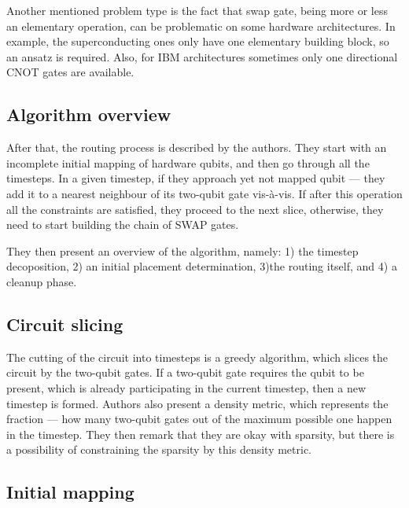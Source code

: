 Another mentioned problem type is the fact that swap gate, being more or less an elementary operation, can be problematic on some hardware architectures. In example, the superconducting ones only have one elementary building block, so an ansatz is required. Also, for IBM architectures sometimes  only one directional CNOT gates are available.

\subsection{Algorithm overview}

After that, the routing process is described by the authors. They start with an incomplete initial mapping of hardware qubits, and then go through all the timesteps. In a given timestep, if they approach yet not mapped qubit — they add it to a nearest neighbour of its two-qubit gate vis-\`{a}-vis. If after this operation all the constraints are satisfied, they proceed to the next slice, otherwise, they need to start building the chain of SWAP gates.


They then present an overview of the algorithm, namely: 1) the timestep decoposition, 2) an initial placement determination, 3)the routing itself, and 4) a cleanup phase. 

\subsection{Circuit slicing}

The cutting of the circuit into timesteps is a greedy algorithm, which slices the circuit by the two-qubit gates. If a two-qubit gate requires the qubit to be present, which is already participating in the current timestep, then a new timestep is formed. Authors also present a density metric, which represents the fraction --- how many two-qubit gates out of the maximum possible one happen in the timestep. They then remark that they are okay with sparsity, but there is a possibility of constraining the sparsity by this density metric.

\subsection{Initial mapping}

